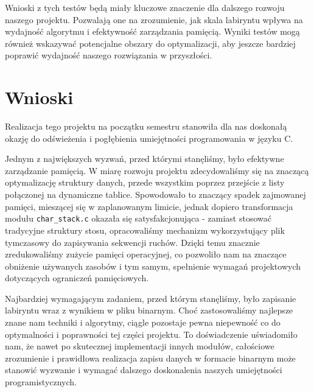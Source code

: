 \documentclass{article}
\begin{document}
\vspace{5mm}

Wnioski z tych testów będą miały kluczowe znaczenie dla dalszego rozwoju naszego projektu. Pozwalają one na zrozumienie, jak skala labiryntu wpływa na wydajność algorytmu i efektywność zarządzania pamięcią. Wyniki testów mogą również wskazywać potencjalne obszary do optymalizacji, aby jeszcze bardziej poprawić wydajność naszego rozwiązania w przyszłości.


\section{Wnioski}

Realizacja tego projektu na początku semestru stanowiła dla nas doskonałą okazję do odświeżenia i pogłębienia umiejętności programowania w języku C.
\vspace{5mm}

Jednym z największych wyzwań, przed którymi stanęliśmy, było efektywne zarządzanie pamięcią. W miarę rozwoju projektu zdecydowaliśmy się na znaczącą optymalizację struktury danych, przede wszystkim poprzez przejście z listy połączonej na dynamiczne tablice. Spowodowało to znaczący spadek zajmowanej pamięci, mieszącej się w zaplanowanym limicie, jednak dopiero transformacja modułu \texttt{char\_stack.c} okazała się satysfakcjonująca - zamiast stosować tradycyjne struktury stosu, opracowaliśmy mechanizm wykorzystujący plik tymczasowy do zapisywania sekwencji ruchów. Dzięki temu znacznie zredukowaliśmy zużycie pamięci operacyjnej, co pozwoliło nam na znaczące obniżenie używanych zasobów i tym samym, spełnienie wymagań projektowych dotyczących ograniczeń pamięciowych.

\vspace{5mm}

Najbardziej wymagającym zadaniem, przed którym stanęliśmy, było zapisanie labiryntu wraz z wynikiem w pliku binarnym. Choć zastosowaliśmy najlepsze znane nam techniki i algorytmy, ciągle pozostaje pewna niepewność co do optymalności i poprawności tej części projektu. To doświadczenie uświadomiło nam, że nawet po skutecznej implementacji innych modułów, całościowe zrozumienie i prawidłowa realizacja zapisu danych w formacie binarnym może stanowić wyzwanie i wymagać dalszego doskonalenia naszych umiejętności programistycznych.
\end{document}
